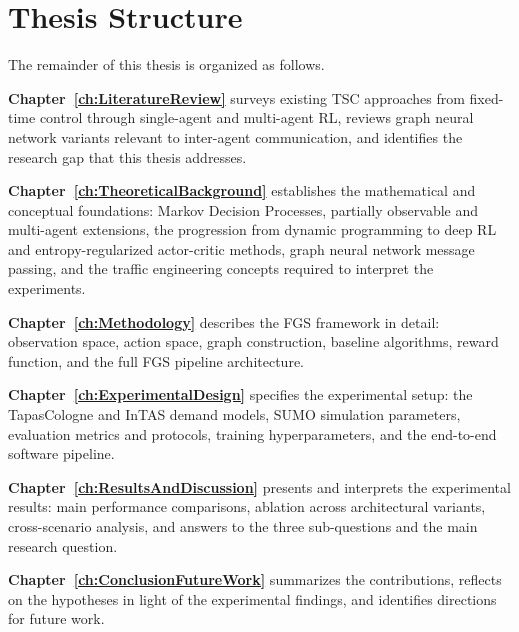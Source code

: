 \section{Thesis Structure}
\label{sec:Introduction_ThesisStructure}

The remainder of this thesis is organized as follows.

\textbf{Chapter~\ref{ch:LiteratureReview}} surveys existing TSC approaches from fixed-time control through single-agent and multi-agent RL, reviews graph neural network variants relevant to inter-agent communication, and identifies the research gap that this thesis addresses.

\textbf{Chapter~\ref{ch:TheoreticalBackground}} establishes the mathematical and conceptual foundations: Markov Decision Processes, partially observable and multi-agent extensions, the progression from dynamic programming to deep RL and entropy-regularized actor-critic methods, graph neural network message passing, and the traffic engineering concepts required to interpret the experiments.

\textbf{Chapter~\ref{ch:Methodology}} describes the FGS framework in detail: observation space, action space, graph construction, baseline algorithms, reward function, and the full FGS pipeline architecture.

\textbf{Chapter~\ref{ch:ExperimentalDesign}} specifies the experimental setup: the TapasCologne and InTAS demand models, SUMO simulation parameters, evaluation metrics and protocols, training hyperparameters, and the end-to-end software pipeline.

\textbf{Chapter~\ref{ch:ResultsAndDiscussion}} presents and interprets the experimental results: main performance comparisons, ablation across architectural variants, cross-scenario analysis, and answers to the three sub-questions and the main research question.

\textbf{Chapter~\ref{ch:ConclusionFutureWork}} summarizes the contributions, reflects on the hypotheses in light of the experimental findings, and identifies directions for future work.
